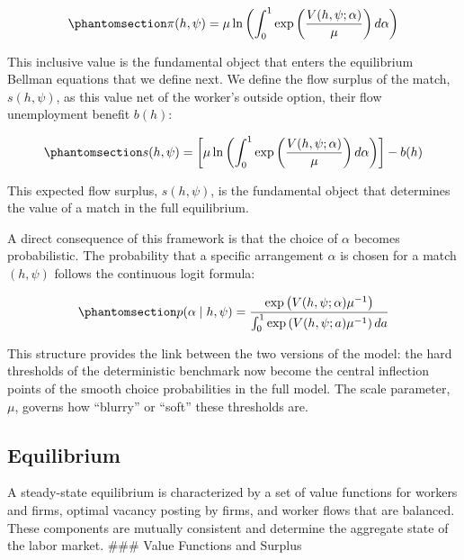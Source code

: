 \documentclass[
  11pt,
  letterpaper,
  DIV=11,
  numbers=noendperiod]{scrartcl}
\begin{document}
\begin{equation}\phantomsection\label{eq-flow-value-solved}{\pi(h, \psi) = \mu \ln \left( \int_0^1 \exp\left(\frac{V(h, \psi; \alpha)}{\mu}\right) d\alpha \right)}\end{equation}

This inclusive value is the fundamental object that enters the
equilibrium Bellman equations that we define next. We define the flow
surplus of the match, \(s(h,\psi)\), as this value net of the worker's
outside option, their flow unemployment benefit \(b(h)\):

\begin{equation}\phantomsection\label{eq-flow-surplus}{ s(h, \psi) = \left[ \mu \ln \left( \int_0^1 \exp\left(\frac{V(h, \psi; \alpha)}{\mu}\right) d\alpha \right) \right] - b(h)}\end{equation}

This expected flow surplus, \(s(h,\psi)\), is the fundamental object
that determines the value of a match in the full equilibrium.

A direct consequence of this framework is that the choice of \(\alpha\)
becomes probabilistic. The probability that a specific arrangement
\(\alpha\) is chosen for a match \((h, \psi)\) follows the continuous
logit formula:

\begin{equation}\phantomsection\label{eq-prob-alpha}{ p(\alpha \mid h, \psi) = \frac{\exp\left({V(h, \psi; \alpha)}{\mu^{-1}}\right)}{\int_0^1 \exp\left({V(h, \psi; a)}{\mu^{-1}}\right) da} }\end{equation}

This structure provides the link between the two versions of the model:
the hard thresholds of the deterministic benchmark now become the
central inflection points of the smooth choice probabilities in the full
model. The scale parameter, \(\mu\), governs how ``blurry'' or ``soft''
these thresholds are.

\subsection{Equilibrium}\label{equilibrium}

A steady-state equilibrium is characterized by a set of value functions
for workers and firms, optimal vacancy posting by firms, and worker
flows that are balanced. These components are mutually consistent and
determine the aggregate state of the labor market. \#\#\# Value
Functions and Surplus
\end{document}
